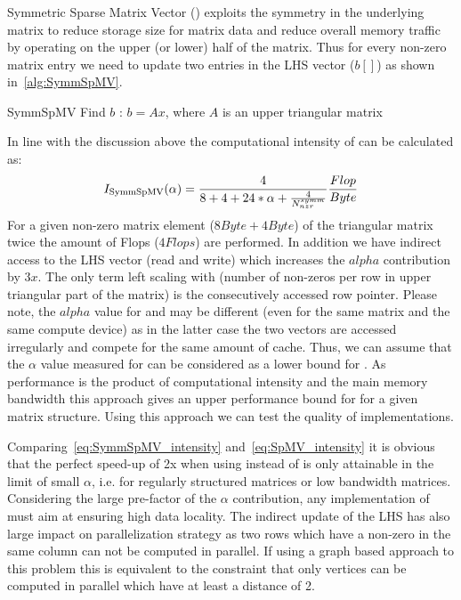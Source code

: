 \subsubsection{\SymmSpmv}
Symmetric Sparse Matrix Vector (\SymmSpmv) exploits the symmetry in the underlying matrix to reduce storage size for matrix data and reduce overall memory traffic by  operating on the upper (or lower) half of the matrix. Thus for every non-zero matrix entry we need to update two entries in the LHS vector ($b[]$) as shown in~\cref{alg:SymmSpMV}.
\begin{algorithm}[H]
	\caption{SymmSpMV Find $b$ : $b=Ax$, where $A$ is an upper triangular matrix} 
	\label{alg:SymmSpMV}
	\begin{algorithmic}[1]
		\ENDFOR
		\ENDFOR
	\end{algorithmic}
\end{algorithm}
In line with the discussion above the computational intensity of \SymmSpmv can be calculated as:
\begin{equation}
\label{eq:SymmSpMV_intensity}
I_\mathrm{\SymmSpmv} (\alpha)= \frac{4}{8+4+24*\alpha+\frac{4}{\NNZRmathSYMM}} \frac{Flop}{Byte}\\
\end{equation}
For a given non-zero matrix element ($8 Byte + 4 Byte$) of the triangular matrix twice the amount of Flops ($4 Flops$)  are performed. In addition we have indirect access to the LHS vector (read and write) which increases the $alpha$ contribution by $3x$. The only term left scaling with \NNZRSYMM (number of non-zeros per row in upper triangular part of the matrix) is the consecutively accessed row pointer. Please note, the $alpha$ value for \SpMV and \SymmSpmv may be different (even for the same matrix and the same compute device) as in the latter case the two vectors are accessed irregularly and compete for the same amount of cache. Thus, we can assume that the $\alpha$ value measured for \SpMV can be considered as a lower bound for \SymmSpmv. As performance is the product of computational intensity and the main memory bandwidth this approach gives an upper performance bound for \SymmSpmv for a given matrix structure.  Using this approach we can test the quality of \SymmSpmv implementations. 

Comparing~\cref{eq:SymmSpMV_intensity} and~\cref{eq:SpMV_intensity} it is obvious that the perfect speed-up of 2x when using \SymmSpmv instead of \SpMV is only attainable in the limit of small $\alpha$, i.e. for regularly structured matrices or low bandwidth matrices. Considering the large pre-factor of the $\alpha$ contribution, any implementation of \SymmSpmv must aim at ensuring high data locality. The indirect update of the LHS has also large impact on parallelization strategy as two rows which have a non-zero in the same column can not be computed in parallel. If using a graph based approach to this problem this is equivalent to the constraint that only vertices can be computed in parallel which have at least a distance of 2.

